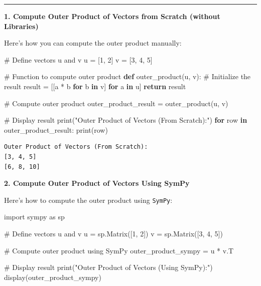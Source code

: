 \documentclass[
  letterpaper,
  DIV=11,
  numbers=noendperiod]{scrreprt}
\newenvironment{Shaded}{\begin{snugshade}}{\end{snugshade}}
\newcommand{\BuiltInTok}[1]{\textcolor[rgb]{0.00,0.23,0.31}{#1}}
\newcommand{\CommentTok}[1]{\textcolor[rgb]{0.37,0.37,0.37}{#1}}
\newcommand{\ControlFlowTok}[1]{\textcolor[rgb]{0.00,0.23,0.31}{\textbf{#1}}}
\newcommand{\DecValTok}[1]{\textcolor[rgb]{0.68,0.00,0.00}{#1}}
\newcommand{\ImportTok}[1]{\textcolor[rgb]{0.00,0.46,0.62}{#1}}
\newcommand{\KeywordTok}[1]{\textcolor[rgb]{0.00,0.23,0.31}{\textbf{#1}}}
\newcommand{\NormalTok}[1]{\textcolor[rgb]{0.00,0.23,0.31}{#1}}
\newcommand{\OperatorTok}[1]{\textcolor[rgb]{0.37,0.37,0.37}{#1}}
\newcommand{\StringTok}[1]{\textcolor[rgb]{0.13,0.47,0.30}{#1}}
\theoremstyle{plain}
\theoremstyle{definition}
\theoremstyle{remark}
\begin{document}
\begin{center}\rule{0.5\linewidth}{0.5pt}\end{center}

\textbf{1. Compute Outer Product of Vectors from Scratch (without
Libraries)}

Here's how you can compute the outer product manually:

\begin{Shaded}
\begin{Highlighting}[]
\CommentTok{\# Define vectors u and v}
\NormalTok{u }\OperatorTok{=}\NormalTok{ [}\DecValTok{1}\NormalTok{, }\DecValTok{2}\NormalTok{]}
\NormalTok{v }\OperatorTok{=}\NormalTok{ [}\DecValTok{3}\NormalTok{, }\DecValTok{4}\NormalTok{, }\DecValTok{5}\NormalTok{]}

\CommentTok{\# Function to compute outer product}
\KeywordTok{def}\NormalTok{ outer\_product(u, v):}
    \CommentTok{\# Initialize the result}
\NormalTok{    result }\OperatorTok{=}\NormalTok{ [[a }\OperatorTok{*}\NormalTok{ b }\ControlFlowTok{for}\NormalTok{ b }\KeywordTok{in}\NormalTok{ v] }\ControlFlowTok{for}\NormalTok{ a }\KeywordTok{in}\NormalTok{ u]}
    \ControlFlowTok{return}\NormalTok{ result}

\CommentTok{\# Compute outer product}
\NormalTok{outer\_product\_result }\OperatorTok{=}\NormalTok{ outer\_product(u, v)}

\CommentTok{\# Display result}
\BuiltInTok{print}\NormalTok{(}\StringTok{"Outer Product of Vectors (From Scratch):"}\NormalTok{)}
\ControlFlowTok{for}\NormalTok{ row }\KeywordTok{in}\NormalTok{ outer\_product\_result:}
    \BuiltInTok{print}\NormalTok{(row)}
\end{Highlighting}
\end{Shaded}

\begin{verbatim}
Outer Product of Vectors (From Scratch):
[3, 4, 5]
[6, 8, 10]
\end{verbatim}

\textbf{2. Compute Outer Product of Vectors Using SymPy}

Here's how to compute the outer product using \texttt{SymPy}:

\begin{Shaded}
\begin{Highlighting}[]
\ImportTok{import}\NormalTok{ sympy }\ImportTok{as}\NormalTok{ sp}

\CommentTok{\# Define vectors u and v}
\NormalTok{u }\OperatorTok{=}\NormalTok{ sp.Matrix([}\DecValTok{1}\NormalTok{, }\DecValTok{2}\NormalTok{])}
\NormalTok{v }\OperatorTok{=}\NormalTok{ sp.Matrix([}\DecValTok{3}\NormalTok{, }\DecValTok{4}\NormalTok{, }\DecValTok{5}\NormalTok{])}

\CommentTok{\# Compute outer product using SymPy}
\NormalTok{outer\_product\_sympy }\OperatorTok{=}\NormalTok{ u }\OperatorTok{*}\NormalTok{ v.T}

\CommentTok{\# Display result}
\BuiltInTok{print}\NormalTok{(}\StringTok{"Outer Product of Vectors (Using SymPy):"}\NormalTok{)}
\NormalTok{display(outer\_product\_sympy)}
\end{Highlighting}
\end{Shaded}
\end{document}
